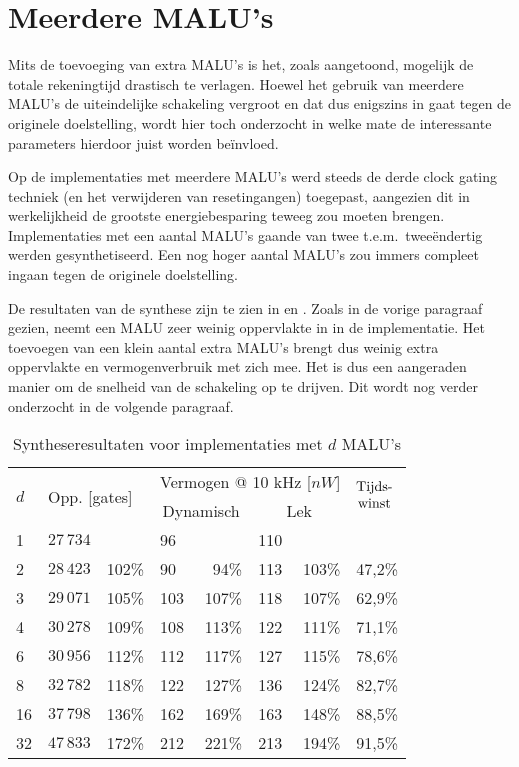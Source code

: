 \section{Meerdere MALU's\label{sectie-resulaten-MALU's}}

Mits de toevoeging van extra MALU's is het, zoals aangetoond, mogelijk de totale rekeningtijd drastisch te verlagen. Hoewel het gebruik van meerdere MALU's de uiteindelijke schakeling vergroot en dat dus enigszins in gaat tegen de originele doelstelling, wordt hier toch onderzocht in welke mate de interessante parameters hierdoor juist worden be\"invloed.

Op de implementaties met meerdere MALU's werd steeds de derde clock gating techniek (en het verwijderen van resetingangen) toegepast, aangezien dit in werkelijkheid de grootste energiebesparing teweeg zou moeten brengen. Implementaties met een aantal MALU's gaande van twee t.e.m.\ twee\"endertig werden gesynthetiseerd. Een nog hoger aantal MALU's zou immers compleet ingaan tegen de originele doelstelling.

De resultaten van de synthese zijn te zien in  en . Zoals in de vorige paragraaf gezien, neemt een MALU zeer weinig oppervlakte in in de implementatie. Het toevoegen van een klein aantal extra MALU's brengt dus weinig extra oppervlakte en vermogenverbruik met zich mee. Het is dus een aangeraden manier om de snelheid van de schakeling op te drijven. Dit wordt nog verder onderzocht in de volgende paragraaf.

\begin{table}[h]
	\caption{Syntheseresultaten voor implementaties met $d$ MALU's}
	\label{tabel-resultaten-md}

	\centering
	\begin{tabular}{llrlrlrl}
		\toprule
		\multirow{2}{*}{$d$} & \multicolumn{2}{l}{\multirow{2}{*}{Opp. [gates]}}	& \multicolumn{4}{c}{Vermogen @ 10 kHz [$nW$]}	& \multirow{2}{*}{$\begin{array}{@{}c@{}}\text{Tijds-}\\\text{winst}\end{array}$}\\
		\cmidrule{4-7}
		&	& & \multicolumn{2}{c}{Dynamisch}	& \multicolumn{2}{c}{Lek}	&\\
		\midrule
		1			& $27\,734$	& 			& 96	& 			& 110	& 			& \\
		2			& $28\,423$	& 102\%	& 90	& 94\%	& 113	& 103\%	& 47,2\%\\
		3			& $29\,071$	& 105\%	& 103	& 107\%	& 118	& 107\%	& 62,9\%\\
		4			& $30\,278$	& 109\%	& 108	& 113\%	& 122	& 111\%	& 71,1\%\\
		6			& $30\,956$	& 112\%	& 112	& 117\%	& 127	& 115\%	& 78,6\%\\
		8			& $32\,782$	& 118\%	& 122	& 127\%	& 136	& 124\%	& 82,7\%\\
		16			& $37\,798$	& 136\%	& 162	& 169\%	& 163	& 148\%	& 88,5\%\\
		32			& $47\,833$	& 172\%	& 212	& 221\%	& 213	& 194\%	& 91,5\%\\
		\hline		
	\end{tabular}
\end{table}

